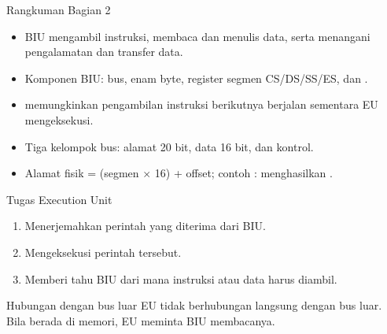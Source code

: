 \documentclass[aspectratio=169,11pt]{beamer}
\begin{document}
\begin{frame}{Rangkuman Bagian 2}
\small
\begin{itemize}
    \item BIU mengambil instruksi, membaca dan menulis data, serta
          menangani pengalamatan dan transfer data.

    \vspace{0.15em}
    \item Komponen BIU: bus,  enam byte, register segmen
          CS/DS/SS/ES, dan .

    \vspace{0.15em}
    \item {} memungkinkan pengambilan instruksi berikutnya
          berjalan sementara EU mengeksekusi.

    \vspace{0.15em}
    \item Tiga kelompok bus: alamat 20 bit, data 16 bit, dan kontrol.

    \vspace{0.15em}
    \item Alamat fisik = (segmen $\times$ 16) + offset; contoh
          : menghasilkan .
\end{itemize}
\end{frame}


\begin{frame}{Tugas Execution Unit}
\small
\begin{enumerate}
    \item Menerjemahkan perintah yang diterima dari BIU.

    \vspace{0.18em}
    \item Mengeksekusi perintah tersebut.

    \vspace{0.18em}
    \item Memberi tahu BIU dari mana instruksi atau data harus
          diambil.
\end{enumerate}

\vspace{0.3em}
\begin{block}{Hubungan dengan bus luar}
\small EU tidak berhubungan langsung dengan bus luar. Bila
 berada di memori, EU meminta BIU membacanya.
\end{block}
\end{frame}
\end{document}
